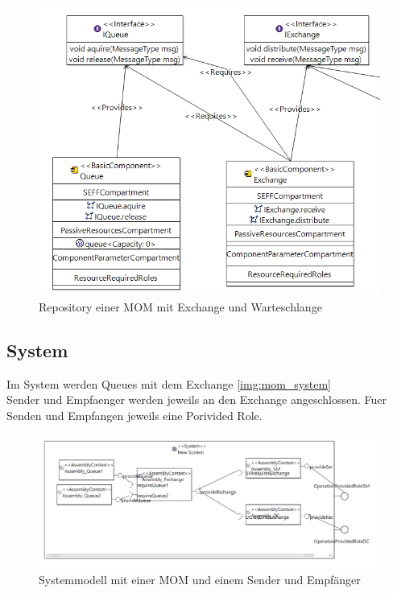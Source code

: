 

\begin{figure}
\center
  \includegraphics[width=1\textwidth]{images/mom_repository.png}
  \caption{Repository einer MOM mit Exchange und Warteschlange}
  \label{img:mom_repository}
\end{figure}

\subsection{System}
Im System werden Queues mit dem Exchange \autoref{img:mom_system}\\
Sender und Empfaenger werden jeweils an den Exchange angeschlossen. Fuer Senden und Empfangen jeweils eine Porivided Role.

\begin{figure}
\center
  \includegraphics[width=1\textwidth]{images/mom_system.png}
  \caption{Systemmodell mit einer MOM und einem Sender und Empfänger}
  \label{img:mom_system}
\end{figure}

